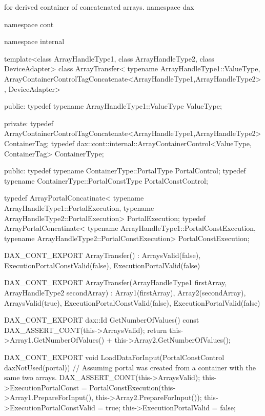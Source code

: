 \begin{daxexample}[ex:DerivedArrayTransfer]{ for derived container of concatenated arrays.}
namespace dax {
namespace cont {
namespace internal {

template<class ArrayHandleType1,
         class ArrayHandleType2,
         class DeviceAdapter>
class ArrayTransfer<
    typename ArrayHandleType1::ValueType,
    ArrayContainerControlTagConcatenate<ArrayHandleType1,ArrayHandleType2>,
    DeviceAdapter>
{
public:
  typedef typename ArrayHandleType1::ValueType ValueType;

private:
  typedef ArrayContainerControlTagConcatenate<ArrayHandleType1,ArrayHandleType2> ContainerTag;
  typedef dax::cont::internal::ArrayContainerControl<ValueType, ContainerTag> ContainerType;

public:
  typedef typename ContainerType::PortalType PortalControl;
  typedef typename ContainerType::PortalConstType PortalConstControl;

  typedef ArrayPortalConcatinate<
      typename ArrayHandleType1::PortalExecution,
      typename ArrayHandleType2::PortalExecution> PortalExecution;
  typedef ArrayPortalConcatinate<
      typename ArrayHandleType1::PortalConstExecution,
      typename ArrayHandleType2::PortalConstExecution> PortalConstExecution;

  DAX_CONT_EXPORT
  ArrayTransfer()
    : ArraysValid(false),
      ExecutionPortalConstValid(false),
      ExecutionPortalValid(false)
  {  }

  DAX_CONT_EXPORT
  ArrayTransfer(ArrayHandleType1 firstArray,
                ArrayHandleType2 secondArray)
    : Array1(firstArray),
      Array2(secondArray),
      ArraysValid(true),
      ExecutionPortalConstValid(false),
      ExecutionPortalValid(false)
  {  }

  DAX_CONT_EXPORT
  dax::Id GetNumberOfValues() const {
    DAX_ASSERT_CONT(this->ArraysValid);
    return this->Array1.GetNumberOfValues() + this->Array2.GetNumberOfValues();
  }

  DAX_CONT_EXPORT
  void LoadDataForInput(PortalConstControl daxNotUsed(portal)) {
    // Assuming portal was created from a container with the same two arrays.
    DAX_ASSERT_CONT(this->ArraysValid);
    this->ExecutionPortalConst = PortalConstExecution(this->Array1.PrepareForInput(),
                                                      this->Array2.PrepareForInput());
    this->ExecutionPortalConstValid = true;
    this->ExecutionPortalValid = false;
  }

}}}}
\end{daxexample}

